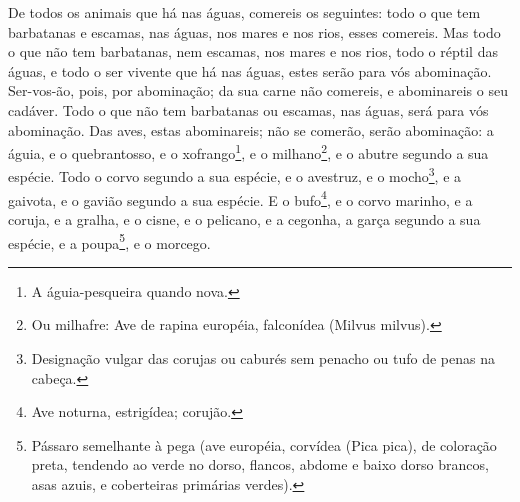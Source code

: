 De todos os animais que há nas águas, comereis os seguintes: todo
o que tem barbatanas e escamas, nas águas, nos mares e nos rios,
esses comereis. Mas todo o que não tem barbatanas, nem
escamas, nos mares e nos rios, todo o réptil das águas, e todo o ser
vivente que há nas águas, estes serão para vós abominação.
Ser-vos-ão, pois, por abominação; da sua carne não comereis,
e abominareis o seu cadáver. Todo o que não tem barbatanas ou
escamas, nas águas, será para vós abominação. Das aves, estas
abominareis; não se comerão, serão abominação: a águia, e o
quebrantosso, e o xofrango\footnote{A águia-pesqueira quando nova.},
e o milhano\footnote{Ou milhafre: Ave de rapina européia,
falconídea (Milvus milvus).}, e o abutre segundo a sua espécie.
Todo o corvo segundo a sua espécie, e o avestruz, e o
mocho\footnote{Designação vulgar das corujas ou caburés sem penacho
ou tufo de penas na cabeça.}, e a gaivota, e o gavião segundo a sua
espécie. E o bufo\footnote{Ave noturna, estrigídea;
corujão.}, e o corvo marinho, e a coruja, e a gralha, e o
cisne, e o pelicano, e a cegonha, a garça segundo a sua
espécie, e a poupa\footnote{Pássaro semelhante à pega (ave européia,
corvídea (Pica pica), de coloração preta, tendendo ao verde no
dorso, flancos, abdome e baixo dorso brancos, asas azuis, e
coberteiras primárias verdes).}, e o morcego.

